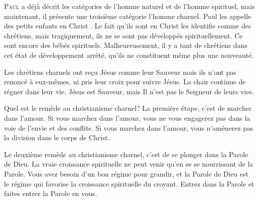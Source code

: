 \dvrule







\lettrine{P}{aul} a déjà décrit les catégories de l'homme naturel
 et de l'homme spirituel, mais maintenant, il présente
 une troisième catégorie \ocadr l'homme charnel.
 Paul les appelle des \Og petits enfants en Christ \Fg{}.
 Le fait qu'ils sont \Og en Christ \Fg{} les identifie
 comme des chrétiens, mais tragiquement, ils ne se sont pas développés
 spirituellement. Ce sont encore des bébés spirituels.
 Malheureusement, il y a tant de chrétiens dans cet état
 de développement arrêté, qu'ils ne constituent même plus une nouveauté.

Les chrétiens charnels ont re\c{c}u Jésus comme leur Sauveur
 mais ils n'ont pas renoncé à eux-mêmes, ni pris leur croix pour suivre Jésus.
 La chair continue de régner dans leur vie.
 Jésus est Sauveur, mais Il n'est pas le Seigneur de leurs vies.


Quel est le remède au christianisme charnel?
 La première étape, c'est de marcher dans l'amour.
 Si vous marchez dans l'amour, vous ne vous engagerez pas
 dans la voie de l'envie et des conflits.
 Si vous marchez dans l'amour, vous n'amènerez pas
 la division dans le corps de Christ.

Le deuxième remède au christianisme charnel,
 c'est de se plonger dans la Parole de Dieu.
 La vraie croissance spirituelle ne peut venir qu'en se se nourrissant
 de la Parole. Vous avez besoin d'un bon régime pour grandir,
 et la Parole de Dieu est le régime qui favorise la croissance
 spirituelle du croyant.
 Entrez dans la Parole et faites entrer la Parole en vous.

